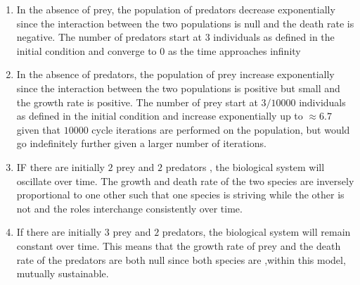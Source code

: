 \documentclass[
	12pt,
	]{article}
\theoremstyle{definition}
\theoremstyle{definition}
\theoremstyle{definition}
\theoremstyle{definition}
\theoremstyle{definition}
\theoremstyle{example}
\theoremstyle{note}
\theoremstyle{remark}
\theoremstyle{example}
\begin{document}
				\begin{enumerate}[label=(\alph*)]
					\color{red} \item \color{black} In the absence of prey, the population of predators decrease exponentially since the interaction between the two populations is null and the death rate is negative. The number of predators start at $3$ individuals as defined in the initial condition and converge to $0$ as the time approaches infinity 
					\color{blue} \item  \color{black} In the absence of predators, the population of prey increase exponentially since the interaction between the two populations is positive but small and the growth rate is positive. The number of prey start at $3/10000$ individuals as defined in the initial condition and increase exponentially up to $\approx 6.7$ given that $10000$ cycle iterations are performed on the population, but would go indefinitely further given a larger number of iterations.
					\item  IF there are initially $2$ prey and $2$ predators , the biological system will oscillate over time. The growth and death rate of the two species are inversely proportional to one other such that one species is striving while the other is not and the roles interchange consistently over time. 
					\color{green} \item \color{black} If there are initially $3$ prey and $2$ predators, the biological system will remain constant over time. This means that the growth rate of prey and the death rate of the predators are both null since both species are ,within this model, mutually sustainable. 
				\end{enumerate}
	
\end{document}
